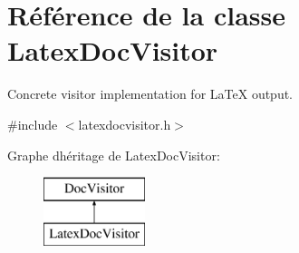 \hypertarget{class_latex_doc_visitor}{}\section{Référence de la classe Latex\+Doc\+Visitor}
\label{class_latex_doc_visitor}


Concrete visitor implementation for La\+Te\+X output.  




{\ttfamily \#include $<$latexdocvisitor.\+h$>$}

Graphe d\textquotesingle{}héritage de Latex\+Doc\+Visitor\+:\begin{figure}[H]
\begin{center}
\leavevmode
\includegraphics[height=2.000000cm]{class_latex_doc_visitor}
\end{center}
\end{figure}
